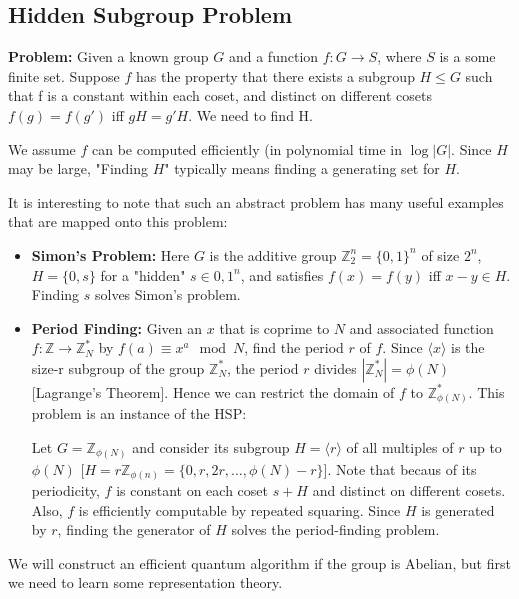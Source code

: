 \subsection{Hidden Subgroup Problem}
\label{subsec: Hidden Subgroup Problem}

\textbf{Problem:} Given a known group $G$ and a function $f: G \rightarrow S$, where $S$ is a some finite set. Suppose $f$ has the property that there exists a subgroup $H \leq G$ such that f is a constant within each coset, and distinct on different cosets $f(g) = f(g')$ iff $gH = g'H$. We need to find H.

We assume $f$ can be computed efficiently (in polynomial time in $\log |G|$. Since $H$ may be large, "Finding $H$" typically means finding a generating set for $H$.

It is interesting to note that such an abstract problem has many useful examples that are mapped onto this problem:

\begin{itemize}
    \item \textbf{Simon's Problem:} Here $G$ is the additive group $\mathbb{Z}_2^n = \{ 0 , 1 \}^n$ of size $2^n$, $H = \{ 0, s \}$ for a "hidden" $s \in {0,1}^n$, and satisfies $f(x) = f(y)$ iff $x-y \in H$. Finding $s$ solves Simon's problem.
    
    \item \textbf{Period Finding:} Given an $x$ that is coprime to $N$ and associated function $f : \mathbb{Z} \rightarrow \mathbb{Z}_N^*$ by $f(a) \equiv x^a \mod N$, find the period $r$ of $f$. Since $\langle x \rangle$ is the size-r subgroup of the group $\mathbb{Z}_N^*$, the period $r$ divides $|\mathbb{Z}_N^*| = \phi(N)$ [Lagrange's Theorem]. Hence we can restrict the domain of $f$ to $\mathbb{Z}_{\phi(N)}^*$. This problem is an instance of the HSP:
    
    Let $G=\mathbb{Z}_{\phi(N)}$ and consider its subgroup $H = \langle r \rangle$ of all multiples of $r$ up to $\phi(N)$ [$H=r \mathbb{Z}_{\phi(n)} = \{0, r, 2r, \dots, \phi(N) - r \}$]. Note that becaus of its periodicity, $f$ is constant on each coset $s + H$ and distinct on different cosets. Also, $f$ is efficiently computable by repeated squaring. Since $H$ is generated by $r$, finding the generator of $H$ solves the period-finding problem.
\end{itemize}

We will construct an efficient quantum algorithm if the group is Abelian, but first we need to learn some representation theory.

